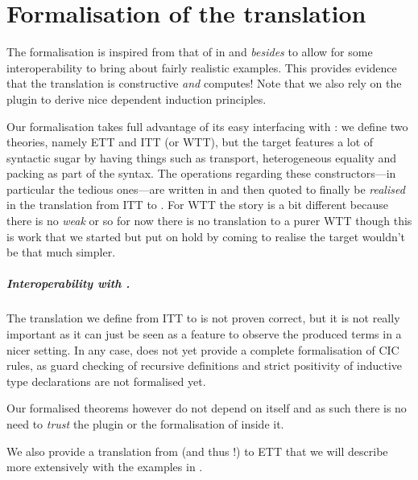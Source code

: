 \chapter{Formalisation of the translation}

The formalisation is inspired from that of \Coq in \MetaCoq and \emph{besides}
\MetaCoq to allow for some interoperability to bring about fairly realistic
examples. This provides evidence that the translation is constructive \emph{and}
computes!
Note that we also rely on the
\Equations~ plugin to
derive nice dependent induction principles.

Our formalisation takes full advantage of its easy interfacing with \MetaCoq:
we define two theories, namely \acrshort{ETT} and \acrshort{ITT}
(or \acrshort{WTT}), but the target features a lot of syntactic
sugar by having things such as transport, heterogeneous equality and packing as
part of the syntax. The operations regarding these constructors---in particular
the tedious ones---are written in \Coq and then quoted to finally be
\emph{realised} in the translation from \acrshort{ITT} to \MetaCoq.
For \acrshort{WTT} the story is a bit different because there is no \emph{weak}
\Coq or \MetaCoq so for now there is no translation to a purer \acrshort{WTT}
though this is work that we started but put on hold by coming to realise the
target wouldn't be that much simpler.

\paragraph{Interoperability with \MetaCoq.}
The translation we define from \acrshort{ITT} to \MetaCoq is not proven
correct, but it is not really important as it can just be seen as a
feature to observe the produced terms in a nicer setting.
In any case, \MetaCoq does not yet provide a complete formalisation of
\acrshort{CIC} rules, as guard checking of recursive definitions and strict
positivity of inductive type declarations are not formalised yet.

Our formalised theorems however do not depend on \MetaCoq itself and as such
there is no need to \emph{trust} the plugin or the formalisation of \Coq inside
it.

We also provide a translation from \MetaCoq (and thus \Coq!) to \acrshort{ETT}
that we will describe more extensively with the examples in
.

